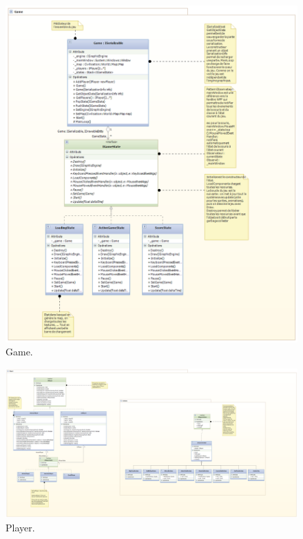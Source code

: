 \begin{figure}
    \begin{center}  
    \includegraphics[width=\textwidth]{game.png}
    \caption{Game.}
    \label{game}
\end{center}
\end{figure}

\begin{figure}
    \begin{center}  
    \includegraphics[width=\textwidth]{player.png}
    \caption{Player.}
    \label{player}
\end{center}
\end{figure}


